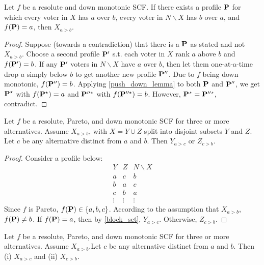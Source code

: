 \begin{lemma}
    \label{block_set}
    Let $f$ be a resolute and down monotonic SCF. If there exists a profile $\mathbf{P}$ for which every voter in $X$ has $a$ over $b$, every voter in $N \backslash X$ has $b$ over $a$, and $f (\mathbf{P}) = a$, then $X_{a>b}$.
\end{lemma}

\begin{proof}
    Suppose (towards a contradiction) that there is a $\mathbf{P}$ as stated and not $X_{a>b}$. Choose a second profile $\mathbf{P}'$ s.t. each voter in $X$ rank $a$ above $b$ and $f(\mathbf{P}') = b$. If any $\mathbf{P}'$ voters in $N \backslash X$ have $a$ over $b$, then let them one-at-a-time drop $a$ simply below $b$ to get another new profile $\mathbf{P}''$. Due to $f$ being down monotonic, $f(\mathbf{P}'') = b$.
    Applying \cref{push_down_lemma} to both $\mathbf{P}$ and $\mathbf{P}''$, we get $\mathbf{P}^\star$ with $f(\mathbf{P}^\star) = a$ and $\mathbf{P}''^\star$ with $f(\mathbf{P}''^\star) = b$. However, $\mathbf{P}^\star = \mathbf{P}''^\star$, contradict.
\end{proof}

\begin{lemma}
    \label{disjoint_sets}
    Let $f$ be a resolute, Pareto, and down monotonic SCF for three or more alternatives. Assume $X_{a>b}$, with $X = Y \cup Z$ split into disjoint subsets $Y$ and $Z$. Let $c$ be any alternative distinct from $a$ and $b$. Then $Y_{a>c}$ or $Z_{c>b}$.
\end{lemma}

\begin{proof}
    Consider a profile below:
    $$
    \begin{array}{ccc}
        Y & Z & N \backslash X\\
        \hline
        a & c & b\\
        b & a & c\\
        c & b & a\\
        \vdots & \vdots & \vdots
    \end{array}
    $$
    Since $f$ is Pareto, $f(\mathbf{P}) \in \{a,b,c\}$. According to the assumption that $X_{a>b}$, $f(\mathbf{P}) \neq b$. If $f(\mathbf{P}) = a$, then by \cref{block_set}, $Y_{a>c}$. Otherwise, $Z_{c>b}$.
\end{proof}

\begin{lemma}
    \label{X_itself}
    Let $f$ be a resolute, Pareto, and down monotonic SCF for three or more alternatives. Assume $X_{a>b}$.Let $c$ be any alternative distinct from $a$ and $b$. Then (i) $X_{a>c}$ and (ii) $X_{c>b}$.
\end{lemma}

